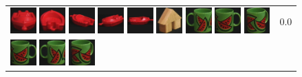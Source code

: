 {\begin{figure}[p]
\begin{tabular}{m{11cm} | m{3cm} |}
\includegraphics[width=1cm]{coil/beeld-20.eps}
\includegraphics[width=1cm]{coil/beeld-23.eps}
\includegraphics[width=1cm]{coil/beeld-22.eps}
\includegraphics[width=1cm]{coil/beeld-21.eps}
\includegraphics[width=1cm]{coil/beeld-19.eps}
\includegraphics[width=1cm]{coil/beeld-45.eps}
\includegraphics[width=1cm]{coil/beeld-31.eps}
\includegraphics[width=1cm]{coil/beeld-30.eps}
\includegraphics[width=1cm]{coil/beeld-33.eps}
& {\scriptsize 0.0}
\\
\includegraphics[width=1cm]{coil/beeld-30.eps}
\includegraphics[width=1cm]{coil/beeld-31.eps}
\includegraphics[width=1cm]{coil/beeld-33.eps}

\end{tabular}
\end{figure}}
